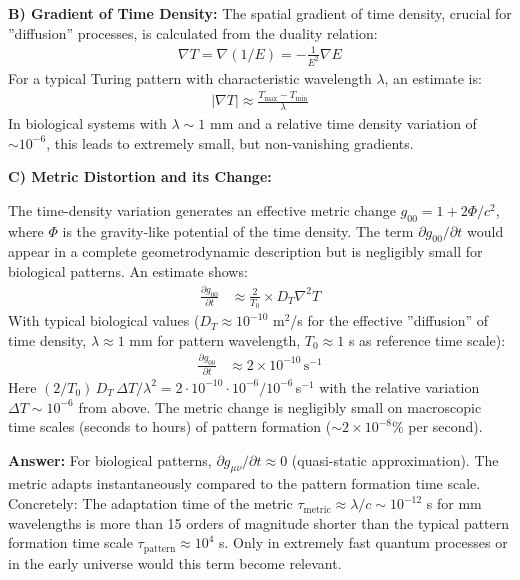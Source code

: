 	\textbf{B) Gradient of Time Density:}
	The spatial gradient of time density, crucial for ''diffusion'' processes, is calculated from the duality relation:
	\begin{align*}
		\nabla T = \nabla(1/E) = -\frac{1}{E^2} \nabla E
	\end{align*}
	For a typical Turing pattern with characteristic wavelength $\lambda$, an estimate is:
	\begin{align*}
		|\nabla T| \approx \frac{T_{\text{max}} - T_{\text{min}}}{\lambda}
	\end{align*}
	In biological systems with $\lambda \sim 1$ mm and a relative time density variation of $\sim 10^{-6}$, this leads to extremely small, but non-vanishing gradients.
	
	\textbf{C) Metric Distortion and its Change:}
	
	The time-density variation generates an effective metric change $g_{00} = 1 + 2\Phi/c^2$, where $\Phi$ is the gravity-like potential of the time density. The term $\partial g_{00}/\partial t$ would appear in a complete geometrodynamic description but is negligibly small for biological patterns. An estimate shows:
	\begin{align*}
		\frac{\partial g_{00}}{\partial t} &\approx \frac{2}{T_0} \times D_T \nabla^2 T
	\end{align*}
	With typical biological values ($D_T \approx 10^{-10}$ m$^2$/s for the effective ''diffusion'' of time density, $\lambda \approx 1$ mm for pattern wavelength, $T_0 \approx 1$ s as reference time scale):
	\begin{align*}
		\frac{\partial g_{00}}{\partial t} &\approx 2 \times 10^{-10} \, \text{s}^{-1}
	\end{align*}
	Here $(2/T_0)\,D_T\,\Delta T/\lambda^2 = 2 \cdot 10^{-10} \cdot 10^{-6}/10^{-6}$\,s$^{-1}$ with the relative variation $\Delta T \sim 10^{-6}$ from above.
	The metric change is negligibly small on macroscopic time scales (seconds to hours) of pattern formation ($\sim 2\times10^{-8}\%$ per second).
	
	\textbf{Answer:} For biological patterns, $\partial g_{\mu\nu}/\partial t \approx 0$ (quasi-static approximation). The metric adapts instantaneously compared to the pattern formation time scale. Concretely: The adaptation time of the metric $\tau_{\text{metric}} \approx \lambda/c \sim 10^{-12}$ s for mm wavelengths is more than 15 orders of magnitude shorter than the typical pattern formation time scale $\tau_{\text{pattern}} \approx 10^4$ s. Only in extremely fast quantum processes or in the early universe would this term become relevant.
	
